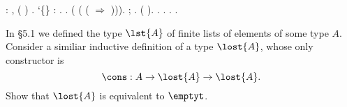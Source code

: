 \begin{coqdoccode}
\coqdocnoindent
{}  : \coqdockw{\ensuremath{\forall}}   ,    ( ) \coqdocnotation{=}  .\coqdoceol
\coqdocemptyline
\coqdocnoindent
{}  `\{\} :  .\coqdoceol
\coqdocnoindent
{}.\coqdoceol
\coqdocindent{1.00em}
 (  ( ( \coqdocvar{\_} \ensuremath{\Rightarrow} ))).\coqdoceol
\coqdocindent{1.00em}
 ;  .\coqdoceol
\coqdocindent{1.00em}
 ( ).\coqdoceol
\coqdocindent{1.00em}
 .\coqdoceol
\coqdocnoindent
{}.\coqdoceol
\coqdocemptyline
\coqdocnoindent
{} .\coqdoceol
\coqdocnoindent
{} .\coqdoceol
\coqdocemptyline
\end{coqdoccode}
In \S5.1 we defined the type $\lst{A}$ of finite lists of elements of some
type $A$.  Consider a similiar inductive definition of a type $\lost{A}$, whose
only constructor is
\[
  \cons : A \to \lost{A} \to \lost{A}.
\]
Show that $\lost{A}$ is equivalent to $\emptyt$.


